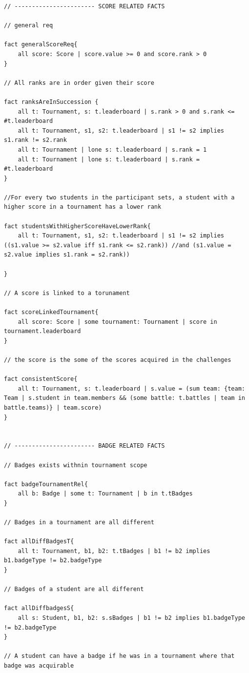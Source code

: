 \begin{lstlisting}[language=alloy,label={lst:alloy_code}]
// ----------------------- SCORE RELATED FACTS

// general req

fact generalScoreReq{
    all score: Score | score.value >= 0 and score.rank > 0
}

// All ranks are in order given their score

fact ranksAreInSuccession {
    all t: Tournament, s: t.leaderboard | s.rank > 0 and s.rank <= #t.leaderboard
    all t: Tournament, s1, s2: t.leaderboard | s1 != s2 implies s1.rank != s2.rank
    all t: Tournament | lone s: t.leaderboard | s.rank = 1
    all t: Tournament | lone s: t.leaderboard | s.rank = #t.leaderboard
}

//For every two students in the participant sets, a student with a higher score in a tournament has a lower rank

fact studentsWithHigherScoreHaveLowerRank{
    all t: Tournament, s1, s2: t.leaderboard | s1 != s2 implies ((s1.value >= s2.value iff s1.rank <= s2.rank)) //and (s1.value = s2.value implies s1.rank = s2.rank))

}

// A score is linked to a torunament

fact scoreLinkedTournament{
    all score: Score | some tournament: Tournament | score in tournament.leaderboard
}

// the score is the some of the scores acquired in the challenges

fact consistentScore{
    all t: Tournament, s: t.leaderboard | s.value = (sum team: {team: Team | s.student in team.members && (some battle: t.battles | team in battle.teams)} | team.score)
}


// ----------------------- BADGE RELATED FACTS

// Badges exists withnin tournament scope

fact badgeTournamentRel{
    all b: Badge | some t: Tournament | b in t.tBadges
}

// Badges in a tournament are all different

fact allDiffBadgesT{
    all t: Tournament, b1, b2: t.tBadges | b1 != b2 implies b1.badgeType != b2.badgeType
}

// Badges of a student are all different

fact allDiffbadgesS{
    all s: Student, b1, b2: s.sBadges | b1 != b2 implies b1.badgeType != b2.badgeType
}

// A student can have a badge if he was in a tournament where that badge was acquirable


\end{lstlisting}
